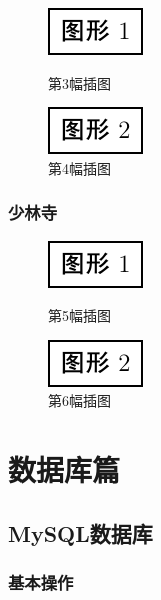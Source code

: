 \documentclass[11pt,a4paper,adobefonts,fancyhdr]{ctexbook}
\begin{document}
\begin{figure}[!ht]
\centering
\includegraphics{graphics1.pdf}
\caption{第3幅插图}
\smallskip
\includegraphics{graphics2.pdf}
\caption{第4幅插图}
\end{figure}

\section{少林寺}

\begin{figure}[!ht]
\centering
\includegraphics{graphics1.pdf}
\caption{第5幅插图}
\smallskip
\includegraphics{graphics2.pdf}
\caption{第6幅插图}
\end{figure}

\part{数据库篇}

\chapter{MySQL数据库}
\section{基本操作}
\end{document}
